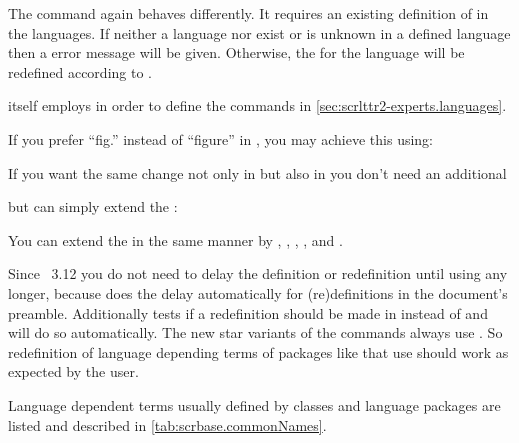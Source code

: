 The command  again behaves differently. It requires an
existing definition of  in the languages.  If neither
a language nor  exist or  is unknown in a
defined language then a error message will be given. Otherwise, the
 for the language will be redefined according to
.

\KOMAScript{} itself employs  in order to define the
commands in \autoref{sec:scrlttr2-experts.languages}.

\begin{Example}
  If you prefer ``fig.'' instead of ``figure'' in , you may
  achieve this using:
\begin{lstcode}
\end{lstcode}
  If you want the same change not only in  but also in
   you don't need an additional
\begin{lstcode}
\end{lstcode}
  but can simply extend the :
\begin{lstcode}
\end{lstcode}
  You can extend the  in the same manner by
  , , , ,
  and .
\end{Example}
  
Since \KOMAScript~3.12 you do not need to
delay the definition or redefinition until 
using  any longer, because  does the
delay automatically for (re)definitions in the document's
preamble. Additionally  tests if a redefinition should be
made in  instead of
 and will do so automatically. The new star
variants of the commands always use . So
redefinition of language depending terms of packages like 
that use  should work as expected by the user.

Language dependent terms usually defined by classes and language
packages are listed and described in \autoref{tab:scrbase.commonNames}.

